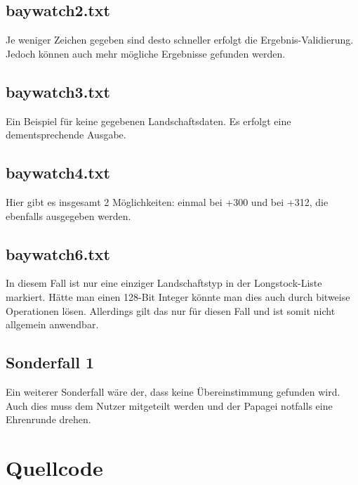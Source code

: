 \documentclass[a4paper,10pt,ngerman]{scrartcl}
\begin{document}
\subsection{baywatch2.txt} Je weniger Zeichen gegeben sind desto schneller erfolgt die Ergebnis-Validierung. Jedoch können auch mehr mögliche Ergebnisse gefunden werden.

\subsection{baywatch3.txt} Ein Beispiel für keine gegebenen Landschaftsdaten. Es erfolgt eine dementsprechende Ausgabe.

\subsection{baywatch4.txt} Hier gibt es insgesamt 2 Möglichkeiten: einmal bei +300 und bei +312, die ebenfalls ausgegeben werden.

\subsection{baywatch6.txt} In diesem Fall ist nur eine einziger Landschaftstyp in der Longstock-Liste markiert. Hätte man einen 128-Bit Integer könnte man dies auch durch bitweise Operationen lösen. Allerdings gilt das nur für diesen Fall und ist somit nicht allgemein anwendbar.

\subsection{Sonderfall 1} Ein weiterer Sonderfall wäre der, dass keine Übereinstimmung gefunden wird. Auch dies muss dem Nutzer mitgeteilt werden und der Papagei notfalls eine Ehrenrunde drehen.

\section{Quellcode}
\end{document}
